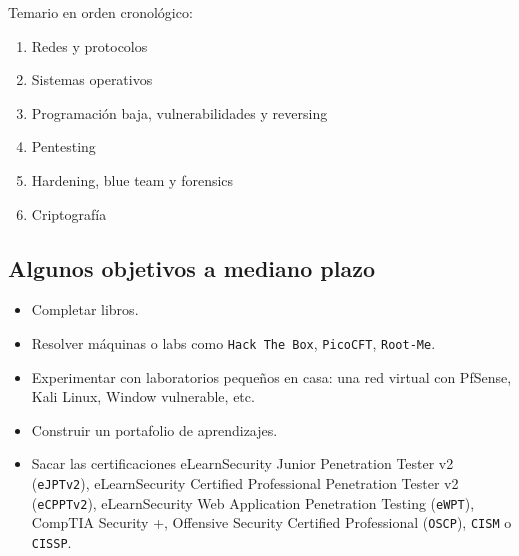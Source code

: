 
Temario en orden cronológico:
 
\begin{enumerate}[label=\textnormal{(\arabic*) }]
\item Redes y protocolos 
\item Sistemas operativos 
\item Programación baja, vulnerabilidades y reversing 
\item Pentesting 
\item Hardening, blue team y forensics 
\item Criptografía
\end{enumerate}

\subsection{Algunos objetivos a mediano plazo}

\begin{itemize}
\item Completar libros. 
\item Resolver máquinas o labs como \texttt{Hack The Box}, \texttt{PicoCFT}, \texttt{Root-Me}. 
\item Experimentar con laboratorios pequeños en casa: una red virtual con PfSense, Kali Linux, Window vulnerable, etc.
\item Construir un portafolio de aprendizajes. 
\item Sacar las certificaciones eLearnSecurity Junior Penetration Tester v2 (\texttt{eJPTv2}), eLearnSecurity Certified Professional Penetration Tester v2 (\texttt{eCPPTv2}), eLearnSecurity Web Application Penetration Testing (\texttt{eWPT}), CompTIA Security +, Offensive Security Certified Professional (\texttt{OSCP}), \texttt{CISM} o \texttt{CISSP}.
\end{itemize}
